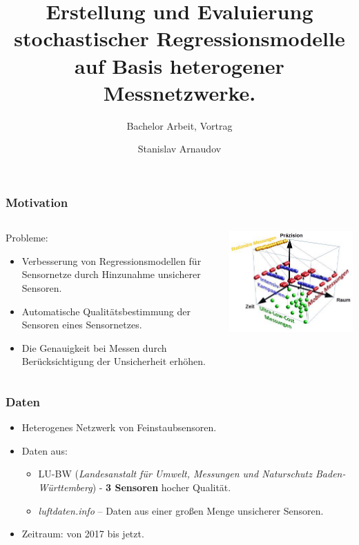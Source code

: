 \documentclass[18pt]{beamer}
\title[Short title]{Erstellung und Evaluierung stochastischer Regressionsmodelle auf Basis heterogener Messnetzwerke.}
\subtitle{Bachelor Arbeit, Vortrag}
\author{Stanislav Arnaudov}
\institute{TECO - Das Telecooperation Office}
\begin{document}
 



\begin{frame}
 \titlepage
\end{frame}

\begin{frame}
  \frametitle{Motivation}
  
  \begin{columns}
    \begin{column}{0.4\textwidth}
      Probleme:
      \begin{itemize}
      \item Verbesserung von Regressionsmodellen für Sensornetze  durch Hinzunahme unsicherer Sensoren.
      \item Automatische Qualitätsbestimmung der Sensoren eines Sensornetzes.
      \item Die Genauigkeit bei Messen durch Berücksichtigung der Unsicherheit erhöhen.
      \end{itemize}
    \end{column}
    \begin{column}{0.6\textwidth}
      \begin{center}
        \includegraphics[scale=0.5]{images/motivation}
      \end{center}
    \end{column}
  \end{columns}
  
\end{frame}

\begin{frame}
  \frametitle{ Daten}
  \begin{itemize}
  \item Heterogenes Netzwerk von Feinstaubsensoren.\\
   \item Daten aus:
    \begin{itemize}
    \item LU-BW (\textit{Landesanstalt für Umwelt, Messungen und Naturschutz Baden-Württemberg}) - \textbf{3 Sensoren} hocher Qualität.
    \item \textit{luftdaten.info} -- Daten aus einer großen Menge unsicherer Sensoren.
    \end{itemize}
    \item Zeitraum: von 2017 bis jetzt.
  \end{itemize}

\end{frame}
\end{document}

